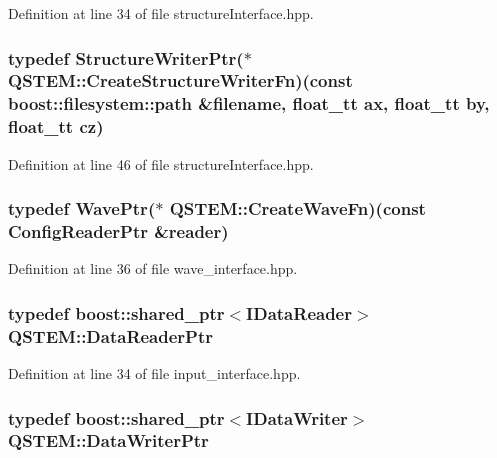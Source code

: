 Definition at line 34 of file structure\-Interface.\-hpp.

\hypertarget{namespace_q_s_t_e_m_a410415444cab11e6e82ba838bacc0ca4}{
\subsubsection[{Create\-Structure\-Writer\-Fn}]{\setlength{\rightskip}{0pt plus 5cm}typedef {\bf Structure\-Writer\-Ptr}($\ast$ Q\-S\-T\-E\-M\-::\-Create\-Structure\-Writer\-Fn)(const boost\-::filesystem\-::path \&{\bf filename}, {\bf float\-\_\-tt} {\bf ax}, {\bf float\-\_\-tt} by, {\bf float\-\_\-tt} cz)}}\label{namespace_q_s_t_e_m_a410415444cab11e6e82ba838bacc0ca4}


Definition at line 46 of file structure\-Interface.\-hpp.

\hypertarget{namespace_q_s_t_e_m_a50bc76f65725c2a74ed6a8c6e2fd6725}{
\subsubsection[{Create\-Wave\-Fn}]{\setlength{\rightskip}{0pt plus 5cm}typedef {\bf Wave\-Ptr}($\ast$ Q\-S\-T\-E\-M\-::\-Create\-Wave\-Fn)(const {\bf Config\-Reader\-Ptr} \&reader)}}\label{namespace_q_s_t_e_m_a50bc76f65725c2a74ed6a8c6e2fd6725}


Definition at line 36 of file wave\-\_\-interface.\-hpp.

\hypertarget{namespace_q_s_t_e_m_ae38d8cc1829f3379403b3020c44938da}{
\subsubsection[{Data\-Reader\-Ptr}]{\setlength{\rightskip}{0pt plus 5cm}typedef boost\-::shared\-\_\-ptr$<${\bf I\-Data\-Reader}$>$ {\bf Q\-S\-T\-E\-M\-::\-Data\-Reader\-Ptr}}}\label{namespace_q_s_t_e_m_ae38d8cc1829f3379403b3020c44938da}


Definition at line 34 of file input\-\_\-interface.\-hpp.

\hypertarget{namespace_q_s_t_e_m_a370bd18d36890fd91e04bf74b84bc02a}{
\subsubsection[{Data\-Writer\-Ptr}]{\setlength{\rightskip}{0pt plus 5cm}typedef boost\-::shared\-\_\-ptr$<${\bf I\-Data\-Writer}$>$ {\bf Q\-S\-T\-E\-M\-::\-Data\-Writer\-Ptr}}}\label{namespace_q_s_t_e_m_a370bd18d36890fd91e04bf74b84bc02a}


